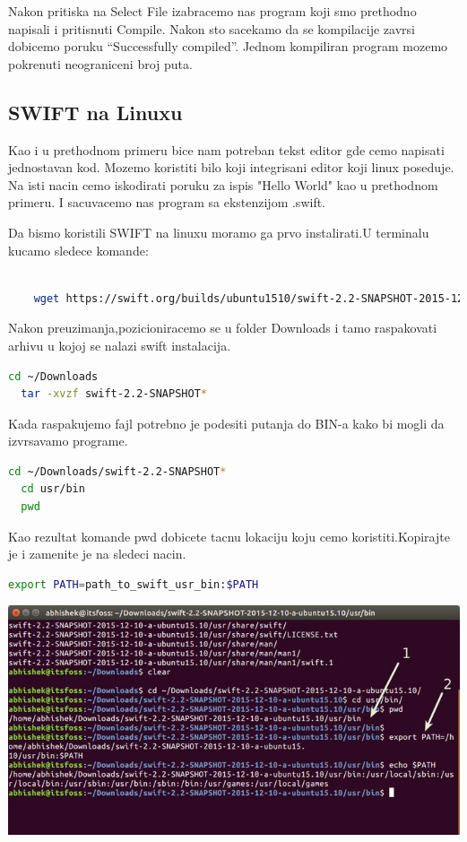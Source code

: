\documentclass[a4paper]{article}
\begin{document}
Nakon pritiska na Select File izabracemo nas program koji smo prethodno napisali i pritisnuti Compile. Nakon sto sacekamo da se kompilacije zavrsi dobicemo poruku “Successfully compiled”.
Jednom kompiliran program mozemo pokrenuti neograniceni broj puta.



\subsection{SWIFT na Linuxu}
\label{subsec:podnaslovLinux}

Kao i u prethodnom primeru bice nam potreban tekst editor gde cemo napisati jednostavan kod.
Mozemo koristiti bilo koji integrisani editor koji linux poseduje. Na isti nacin cemo iskodirati poruku za ispis "Hello World" kao u prethodnom primeru. I sacuvacemo nas program sa ekstenzijom .swift.

Da bismo koristili SWIFT na linuxu moramo ga prvo instalirati.U terminalu kucamo sledece komande:


\begin{lstlisting}[language=bash]

	wget https://swift.org/builds/ubuntu1510/swift-2.2-SNAPSHOT-2015-12-10-a/swift-2.2-SNAPSHOT-2015-12-10-a-ubuntu15.10.tar.gz

\end{lstlisting}
Nakon preuzimanja,pozicioniracemo se u folder Downloads i tamo raspakovati arhivu u kojoj se nalazi swift instalacija.



\begin{lstlisting}[language=bash]
  cd ~/Downloads
  tar -xvzf swift-2.2-SNAPSHOT*
\end{lstlisting}

Kada raspakujemo fajl potrebno je podesiti putanja do BIN-a kako bi mogli da izvrsavamo programe.

\vspace{5mm}

\begin{lstlisting}[language=bash]
  cd ~/Downloads/swift-2.2-SNAPSHOT*
  cd usr/bin
  pwd
\end{lstlisting}

Kao rezultat komande pwd dobicete tacnu lokaciju koju cemo koristiti.Kopirajte je i zamenite je na sledeci nacin.
\begin{lstlisting}[language=bash]
  export PATH=path_to_swift_usr_bin:$PATH

\end{lstlisting}
\includegraphics[scale=0.4]{swift-lin.jpeg}
\end{document}
